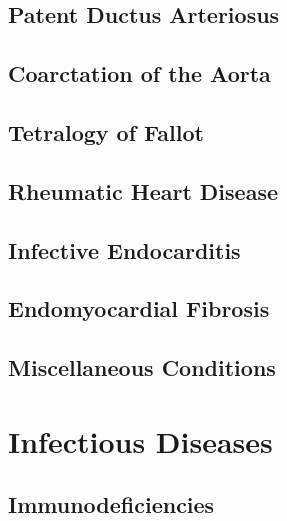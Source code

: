 \documentclass[
  letterpaper,
  DIV=11,
  numbers=noendperiod]{scrreprt}
\begin{document}
\hypertarget{patent-ductus-arteriosus}{%
\chapter{Patent Ductus Arteriosus}\label{patent-ductus-arteriosus}}

\hypertarget{coarctation-of-the-aorta}{%
\chapter{Coarctation of the Aorta}\label{coarctation-of-the-aorta}}

\hypertarget{tetralogy-of-fallot}{%
\chapter{Tetralogy of Fallot}\label{tetralogy-of-fallot}}

\hypertarget{rheumatic-heart-disease}{%
\chapter{Rheumatic Heart Disease}\label{rheumatic-heart-disease}}

\hypertarget{infective-endocarditis}{%
\chapter{Infective Endocarditis}\label{infective-endocarditis}}

\hypertarget{endomyocardial-fibrosis}{%
\chapter{Endomyocardial Fibrosis}\label{endomyocardial-fibrosis}}

\hypertarget{miscellaneous-conditions}{%
\chapter{Miscellaneous Conditions}\label{miscellaneous-conditions}}

\part{{Infectious Diseases}}

\hypertarget{immunodeficiencies}{%
\chapter{Immunodeficiencies}\label{immunodeficiencies}}
\end{document}
